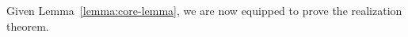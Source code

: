 %
%
%
%
%
%

Given Lemma~\ref{lemma:core-lemma}, we are now equipped to prove the realization theorem.

